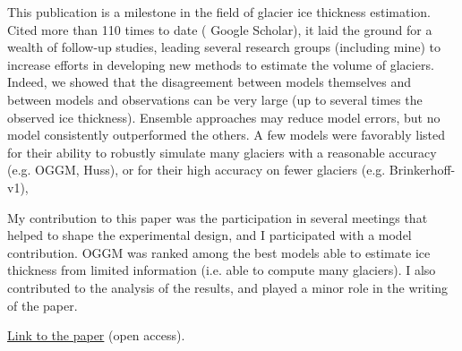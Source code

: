 This publication is a milestone in the field of glacier ice thickness estimation. Cited more than 110 times to date (
Google Scholar), it laid the ground for a wealth of follow-up studies, leading several research groups (including mine)
to increase efforts in developing new methods to estimate the volume of glaciers. Indeed, we showed that the
disagreement between models themselves and between models and observations can be very large (up to several times the
observed ice thickness). Ensemble approaches may reduce model errors, but no model consistently outperformed the others.
A few models were favorably listed for their ability to robustly simulate many glaciers with a reasonable accuracy (e.g.
OGGM, Huss), or for their high accuracy on fewer glaciers (e.g. Brinkerhoff-v1),

My contribution to this paper was the participation in several meetings that helped to shape the experimental design,
and I participated with a model contribution. OGGM was ranked among the best models able to estimate ice thickness from
limited information (i.e. able to compute many glaciers). I also contributed to the analysis of the
results, and played a minor role in the writing of the paper.


\href{https://doi.org/10.5194/tc-11-949-2017}{Link to the paper} (open access).


%

